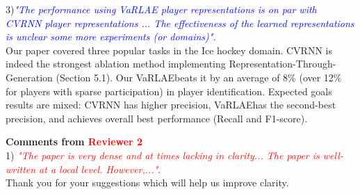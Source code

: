 \documentclass{article}
\newcommand{\system}{VaRLAE\;}
\begin{document}
3)\textcolor{Blue}{\it "The performance using VaRLAE player representations is on par with CVRNN player representations ... The effectiveness of the learned representations is unclear some more experiments (or domains)".}\\
Our paper covered three popular tasks in the Ice hockey domain.
CVRNN is indeed the strongest 
ablation method implementing Representation-Through-Generation (Section 5.1). Our \system  beats it by an average of 8\% (over 12\% for players with sparse participation) in player identification. Expected goals results are mixed: CVRNN has higher precision, \system has the second-best precision, and achieves overall best performance (Recall and F1-score). 



{\bf Comments from \textcolor{red}{Reviewer 2}}\\
1) \textcolor{Red}{\it "The paper is very dense and at times lacking in clarity... The paper is well-written at a local level. However,..."}.\\
Thank you for your suggestions which will help us improve clarity. 
\end{document}
